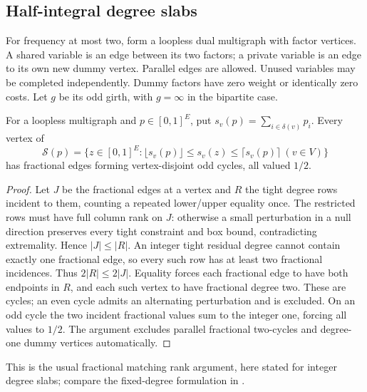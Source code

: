 \subsection{Half-integral degree slabs}
For frequency at most two, form a loopless dual multigraph with factor
vertices. A shared variable is an edge between its two factors; a private
variable is an edge to its own new dummy vertex. Parallel edges are
allowed. Unused variables may be completed independently. Dummy factors
have zero weight or identically zero costs. Let $g$ be its odd girth,
with $g=\infty$ in the bipartite case.

\begin{lemma}\label{lem:degree-slab}
For a loopless multigraph and $p\in[0,1]^E$, put
$s_v(p)=\sum_{i\in\delta(v)}p_i$. Every vertex of
\[
 \mathcal S(p)=\{z\in[0,1]^E:
       \lfloor s_v(p)\rfloor\le s_v(z)\le\lceil s_v(p)\rceil\ (v\in V)\}
\]
has fractional edges forming vertex-disjoint odd cycles, all valued $1/2$.
\end{lemma}
\begin{proof}
Let $J$ be the fractional edges at a vertex and $R$ the tight degree rows
incident to them, counting a repeated lower/upper equality once.
The restricted rows must have full column rank on $J$: otherwise a
small perturbation in a null direction preserves every tight constraint
and box bound, contradicting extremality. Hence $|J|\le|R|$.
An integer tight residual degree cannot contain exactly one fractional
edge, so every such row has at least two fractional incidences. Thus
$2|R|\le2|J|$. Equality forces each fractional edge to have both endpoints
in $R$, and each such vertex to have fractional degree two. These are
cycles; an even cycle admits an alternating perturbation and is excluded.
On an odd cycle the two incident fractional values sum to the integer
one, forcing all values to $1/2$. The argument excludes parallel
fractional two-cycles and degree-one dummy vertices automatically.
\end{proof}
This is the usual fractional matching rank argument, here stated for
integer degree slabs; compare the fixed-degree formulation in
\citet[Theorem 2.1]{Barrus2014}.

